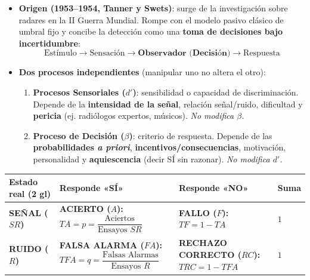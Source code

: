 \documentclass[11pt,a4paper]{article}
\begin{document}
\begin{itemize}
  \item \textbf{Origen (1953--1954, Tanner y Swets)}: surge de la investigación sobre radares en la II Guerra Mundial. Rompe con el modelo pasivo clásico de umbral fijo y concibe la detección como una \textbf{toma de decisiones bajo incertidumbre}:
  \[
    \text{Estímulo} \longrightarrow \text{Sensación} \longrightarrow \textbf{Observador (Decisión)} \longrightarrow \text{Respuesta}
  \]
  \item \textbf{Dos procesos independientes} (manipular uno no altera el otro):
  \begin{enumerate}
    \item \textbf{Procesos Sensoriales ($d'$)}: sensibilidad o capacidad de discriminación. Depende de la \textbf{intensidad de la señal}, relación señal/ruido, dificultad y \textbf{pericia} (ej. radiólogos expertos, músicos). \textit{No modifica $\beta$.}
    \item \textbf{Proceso de Decisión ($\beta$)}: criterio de respuesta. Depende de las \textbf{probabilidades \textit{a priori}}, \textbf{incentivos/consecuencias}, motivación, personalidad y \textbf{aquiescencia} (decir SÍ sin razonar). \textit{No modifica $d'$.}
  \end{enumerate}
\end{itemize}

\vspace{0.3em}
\begin{center}
\small
\renewcommand{\arraystretch}{1.45}
\begin{tabularx}{\textwidth}{@{}>{\raggedright\arraybackslash}p{3.1cm}|>{\centering\arraybackslash}X|>{\centering\arraybackslash}X|>{\centering\arraybackslash}p{1.2cm}@{}}
\toprule
\rowcolor{Primary!15}
\textbf{Estado real (2 gl)} & \textbf{Responde «SÍ»} & \textbf{Responde «NO»} & \textbf{Suma} \\
\midrule
\textbf{SEÑAL ($SR$)} & \cellcolor{SoftBg}\textbf{ACIERTO ($A$):}\newline $TA = p = \dfrac{\text{Aciertos}}{\text{Ensayos } SR}$ & \textbf{FALLO ($F$):}\newline $TF = 1 - TA$ & $1$ \\[0.7em]
\textbf{RUIDO ($R$)} & \cellcolor{WarmBg}\textbf{FALSA ALARMA ($FA$):}\newline $TFA = q = \dfrac{\text{Falsas Alarmas}}{\text{Ensayos } R}$ & \textbf{RECHAZO CORRECTO ($RC$):}\newline $TRC = 1 - TFA$ & $1$ \\
\bottomrule
\end{tabularx}
\end{center}
\vspace{0.2em}
\end{document}
